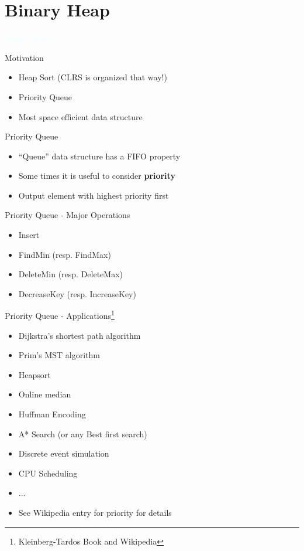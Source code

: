 \documentclass{beamer}
\newcommand{\thblue}[1]{{\Huge {\textcolor{azure}{#1}}}}
\begin{document}
\section{Binary Heap}
\begin{frame}{}
    \begin{center}
        \thblue{Binary Heap}
    \end{center}
\end{frame}

\begin{frame}{Motivation}
    \begin{itemize}
        \item Heap Sort (CLRS is organized that way!)
        \item Priority Queue
        \item Most space efficient data structure
    \end{itemize}
\end{frame}

\begin{frame}{Priority Queue}
    \begin{itemize}
        \item ``Queue'' data structure has a FIFO property
        \item Some times it is useful to consider {\bf priority}
        \item Output element with highest priority first
    \end{itemize}
\end{frame}

\begin{frame}{Priority Queue - Major Operations}
    \begin{itemize}
        \item Insert
        \item FindMin (resp. FindMax)
        \item DeleteMin (resp. DeleteMax) 
        \item DecreaseKey (resp. IncreaseKey)
    \end{itemize}
\end{frame}

\begin{frame}{Priority Queue - Applications\footnote{{Kleinberg-Tardos Book and Wikipedia}}}
    \begin{itemize}
        \item Dijkstra's shortest path algorithm
        \item Prim's MST algorithm
        \item Heapsort
        \item Online median
        \item Huffman Encoding
        \item A* Search (or any Best first search)
        \item Discrete event simulation
        \item CPU Scheduling
        \item $\ldots$
        \item See Wikipedia entry for priority for details
    \end{itemize}
\end{frame}
\end{document}

